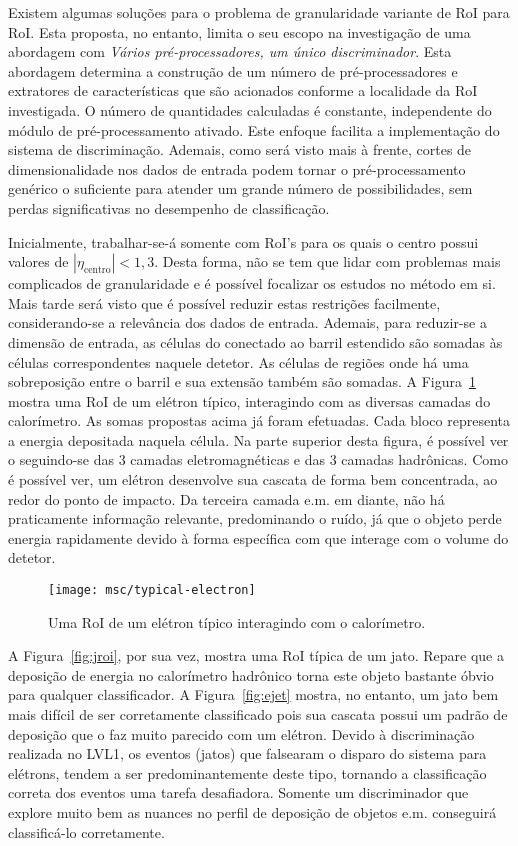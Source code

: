 Existem algumas soluções para o problema de granularidade variante de RoI para
RoI. Esta proposta, no entanto, limita o seu escopo na investigação de uma
abordagem com \emph{Vários pré-processadores, um único discriminador}. Esta
abordagem determina a construção de um número de pré-processadores e
extratores de características que são acionados conforme a localidade da RoI
investigada. O número de quantidades calculadas é constante, independente do
módulo de pré-processamento ativado. Este enfoque facilita a implementação do
sistema de discriminação. Ademais, como será visto mais à frente, cortes de
dimensionalidade nos dados de entrada podem tornar o pré-processamento
genérico o suficiente para atender um grande número de possibilidades, sem
perdas significativas no desempenho de classificação.

Inicialmente, trabalhar-se-á somente com RoI's para os quais o centro possui
valores de $|\eta_{\text{centro}}|<1,3$. Desta forma, não se tem que lidar com
problemas mais complicados de granularidade e é possível focalizar os estudos
no método em si. Mais tarde será visto que é possível reduzir estas restrições
facilmente, considerando-se a relevância dos dados de entrada. Ademais, para
reduzir-se a dimensão de entrada, as células do  conectado ao barril
estendido são somadas às células correspondentes naquele detetor. As células
de regiões onde há uma sobreposição entre o barril e sua extensão também são
somadas. A Figura~\ref{fig:eroi} mostra uma RoI de um elétron típico,
interagindo com as diversas camadas do calorímetro. As somas propostas acima
já foram efetuadas. Cada bloco representa a energia depositada naquela
célula. Na parte superior desta figura, é possível ver o 
seguindo-se das 3 camadas eletromagnéticas e das 3 camadas hadrônicas. Como é
possível ver, um elétron desenvolve sua cascata de forma bem concentrada, ao
redor do ponto de impacto. Da terceira camada e.m. em diante, não há
praticamente informação relevante, predominando o ruído, já que o objeto perde
energia rapidamente devido à forma específica com que interage com o volume do
detetor.

\begin{figure}
\begin{center}
\texttt{[image: msc/typical-electron]}
\end{center}
\caption{Uma RoI de um elétron típico interagindo com o calorímetro.}
\label{fig:eroi}
\end{figure}

A Figura~\ref{fig:jroi}, por sua vez, mostra uma RoI típica de um jato. Repare
que a deposição de energia no calorímetro hadrônico torna este objeto bastante
óbvio para qualquer classificador. A Figura~\ref{fig:ejet} mostra, no entanto,
um jato bem mais difícil de ser corretamente classificado pois sua cascata
possui um padrão de deposição que o faz muito parecido com um elétron. Devido
à discriminação realizada no LVL1, os eventos (jatos) que falsearam o disparo
do sistema para elétrons, tendem a ser predominantemente deste tipo, tornando
a classificação correta dos eventos uma tarefa desafiadora. Somente um
discriminador que explore muito bem as nuances no perfil de deposição de
objetos e.m. conseguirá classificá-lo corretamente.

